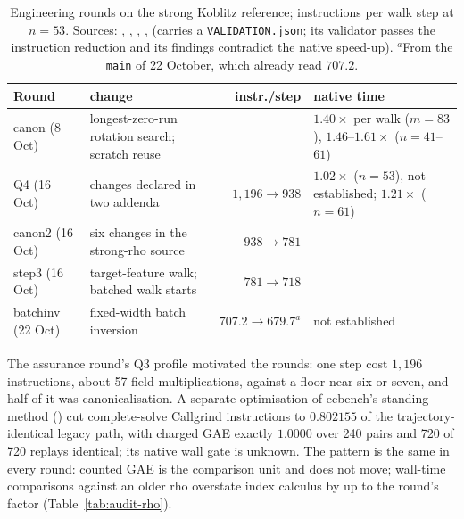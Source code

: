 \begin{table}[t]
\centering\small
\begin{tabularx}{\linewidth}{@{}l>{\raggedright}Xr>{\raggedright\arraybackslash}X@{}}
\toprule
Round & change & instr./step & native time \\
\midrule
canon (8 Oct) & longest-zero-run rotation search; scratch reuse & & $1.40\times$ per walk ($m=83$), $1.46$--$1.61\times$ ($n=41$--$61$) \\
Q4 (16 Oct) & changes declared in two addenda & $1{,}196\to938$ & $1.02\times$ ($n=53$), not established; $1.21\times$ ($n=61$) \\
canon2 (16 Oct) & six changes in the strong-rho source & $938\to781$ & \\
step3 (16 Oct) & target-feature walk; batched walk starts & $781\to718$ & \\
batchinv (22 Oct) & fixed-width batch inversion & $707.2\to679.7^{a}$ & not established \\
\bottomrule
\end{tabularx}
\caption[]{Engineering rounds on the strong Koblitz reference; instructions per walk step at $n=53$. Sources:
,
,
, ,
 (carries a
\texttt{VALIDATION.json}; its validator passes the instruction reduction
and its findings contradict the native speed-up). $^{a}$From the \texttt{main} of 22 October, which already read $707.2$.}
\label{tab:mr-rounds}
\end{table}

The assurance round's Q3 profile motivated the rounds:
one step cost $1{,}196$ instructions, about 57 field multiplications,
against a floor near six or seven, and half of it was canonicalisation. A
separate optimisation of ecbench's standing method
() cut complete-solve
Callgrind instructions to $0.802155$ of the trajectory-identical legacy
path, with charged GAE exactly $1.0000$ over 240 pairs and 720 of 720
replays identical; its native wall gate is unknown. The pattern is the
same in every round: counted GAE is the comparison unit and does not move;
wall-time comparisons against an older rho overstate index calculus by up
to the round's factor (Table~\ref{tab:audit-rho}).

